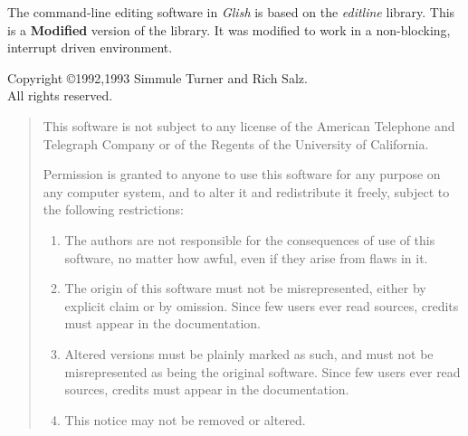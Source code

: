 The command-line editing software in {\em Glish} is based on the
{\em editline} library. This is a {\bf\sc Modified} version of the
library. It was modified to work in a non-blocking, interrupt driven
environment.

\begin{center}
Copyright \copyright 1992,1993 Simmule Turner and Rich Salz. \\
All rights reserved.
\end{center}

\begin{sloppy}
\begin{quotation}

This software is not subject to any license of the American Telephone
and Telegraph Company or of the Regents of the University of California.

Permission is granted to anyone to use this software for any purpose on
any computer system, and to alter it and redistribute it freely, subject
to the following restrictions:

\begin{enumerate}
\item The authors are not responsible for the consequences of use of this
   software, no matter how awful, even if they arise from flaws in it.
\item The origin of this software must not be misrepresented, either by
   explicit claim or by omission.  Since few users ever read sources,
   credits must appear in the documentation.
\item Altered versions must be plainly marked as such, and must not be
   misrepresented as being the original software.  Since few users
   ever read sources, credits must appear in the documentation.
\item This notice may not be removed or altered.
\end{enumerate}
\end{quotation}
\end{sloppy}
